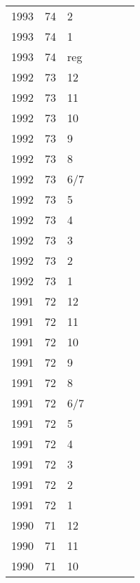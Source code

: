 \begin{longtable}{ |l|l|l|l|p{2.7cm}|l|p{2cm}| }
 1993 & 74 &     2 &         &                &  & \\
 1993 & 74 &     1 &         &                &  & \\
 1993 & 74 &   reg &         &                &  & \\
 1992 & 73 &    12 &         &                &  & \\
 1992 & 73 &    11 &         &                &  & \\
 1992 & 73 &    10 &         &                &  & \\
 1992 & 73 &     9 &         &                &  & \\
 1992 & 73 &     8 &         &                &  & \\
 1992 & 73 &   6/7 &         &                &  & \\
 1992 & 73 &     5 &         &                &  & \\
 1992 & 73 &     4 &         &                &  & \\
 1992 & 73 &     3 &         &                &  & \\
 1992 & 73 &     2 &         &                &  & \\
 1992 & 73 &     1 &         &                &  & \\
 1991 & 72 &    12 &         &                &  & \\
 1991 & 72 &    11 &         &                &  & \\
 1991 & 72 &    10 &         &                &  & \\
 1991 & 72 &     9 &         &                &  & \\
 1991 & 72 &     8 &         &                &  & \\
 1991 & 72 &   6/7 &         &                &  & \\
 1991 & 72 &     5 &         &                &  & \\
 1991 & 72 &     4 &         &                &  & \\
 1991 & 72 &     3 &         &                &  & \\
 1991 & 72 &     2 &         &                &  & \\
 1991 & 72 &     1 &         &                &  & \\
 1990 & 71 &    12 &         &                &  & \\
 1990 & 71 &    11 &         &                &  & \\
 1990 & 71 &    10 &         &                &  & \\

\end{longtable}
